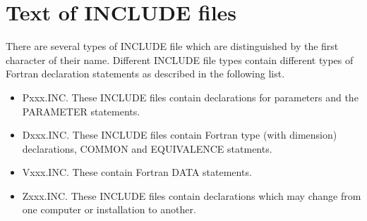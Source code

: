 \section{Text of INCLUDE files}
There are several types of INCLUDE file which are distinguished by the
first character of their name.  Different INCLUDE file types contain
different types of Fortran declaration statements as described in the
following list.
\begin{itemize} %
\item Pxxx.INC.  These INCLUDE files contain declarations for parameters and
the PARAMETER statements.
\item Dxxx.INC.  These INCLUDE files contain Fortran type (with dimension)
declarations, COMMON and EQUIVALENCE statments.
\item Vxxx.INC.  These contain Fortran DATA statements.
\item Zxxx.INC.  These INCLUDE files contain declarations which may change
from one computer or installation to another.

\end{itemize} %
